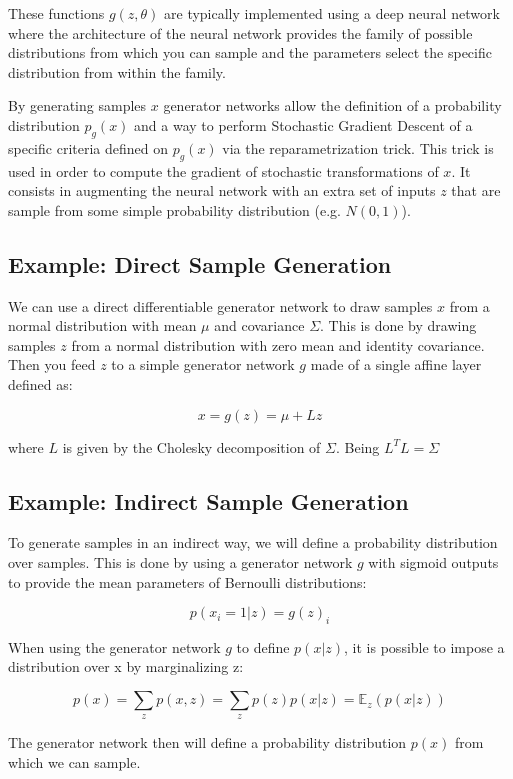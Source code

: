 These functions $g(z, \theta)$ are typically implemented using a deep neural network where the architecture of the neural network provides the family of possible distributions from which you can sample and the parameters select the specific distribution from within the family.

By generating samples $x$ generator networks allow the definition of a probability distribution $p_g (x)$ and a way to perform Stochastic Gradient Descent of a specific criteria defined on $p_g (x)$ via the reparametrization trick. This trick is used in order to compute the gradient of stochastic transformations of $x$. It consists in augmenting the neural network with an extra set of inputs $z$ that are sample from some simple probability distribution (e.g. $N(0,1)$).

\subsection{Example: Direct Sample Generation}

We can use a direct differentiable generator network to draw samples $x$ from a normal distribution with mean $\mu$ and covariance $\Sigma$. This is done by drawing samples $z$ from a normal distribution with zero mean and identity covariance. Then you feed $z$ to a simple generator network $g$ made of a single affine layer defined as:

$$ x = g(z) = \mu + Lz $$

where $L$ is given by the Cholesky decomposition of $\Sigma$. Being $L^T L = \Sigma$

\subsection{Example: Indirect Sample Generation}

To generate samples in an indirect way, we will define a probability distribution over samples. This is done by using a generator network $g$ with sigmoid outputs to provide the mean parameters of Bernoulli distributions:

$$ p(x_i = 1 \vert z) = g(z)_i $$

\noindent When using the generator network $g$ to define $p(x|z)$, it is possible to impose a distribution over x by marginalizing z:

$$ p(x) =  \sum_z p(x, z) = \sum_z p(z) p(x | z) = \mathbb{E}_z (p(x \vert z))$$

\noindent The generator network then will define a probability distribution $p(x)$ from which we can sample.

